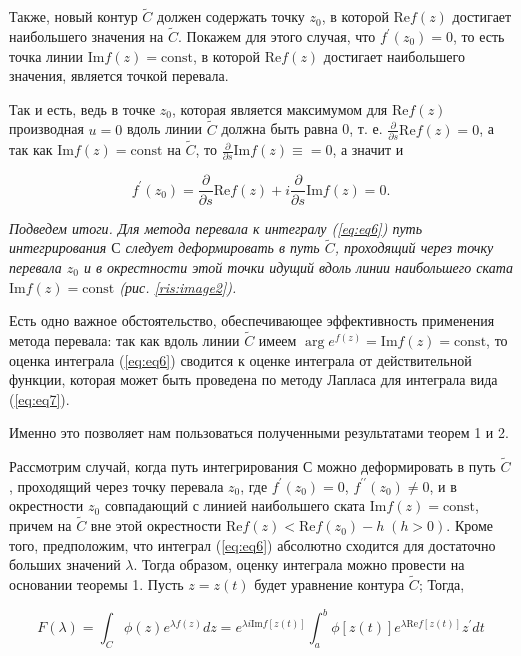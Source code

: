 \documentclass[14pt]{extarticle}
\renewcommand{\Re}{\mathrm{Re}}
\renewcommand{\Im}{\mathrm{Im}}
\newcommand{\const}{\mathrm{const}}
\begin{document}
Также, новый контур $\widetilde{C}$ должен содержать точку $z_0$, в которой $\Re f(z)$ достигает наибольшего значения на $\widetilde{C}$. Покажем для этого случая, что $f^\prime (z_0) = 0$, то есть точка линии $\Im f(z) = \const$, в которой $\Re f (z)$ достигает наибольшего значения, является точкой перевала.

Так и есть, ведь в точке $z_0$, которая является максимумом для $\Re f (z)$ производная $u=0$ вдоль линии $\widetilde{C}$ должна быть равна 0, т. е. $\frac{\partial}{\partial s}\Re f(z)=0$, а так как $\Im f(z) = \const$ на $\widetilde{C}$, то $\frac{\partial}{\partial s} \Im f(z) \equiv = 0$, а значит и 

$$
f^\prime(z_0) = \frac{\partial}{\partial s} \Re f(z) + i\frac{\partial}{\partial s} \Im f(z) = 0.
$$ 
  
\textit{Подведем итоги. Для метода перевала к интегралу (\ref{eq:eq6}) путь интегрирования $С$ следует деформировать в путь $\widetilde{C}$, проходящий через точку перевала $z_0$ и в окрестности этой точки идущий вдоль линии наибольшего ската $\Im f(z) = \const$ (рис. \ref{ris:image2}).}

Есть одно важное обстоятельство, обеспечивающее эффективность применения метода перевала: так как вдоль линии $\widetilde{C}$ имеем $\arg e^{f(z)} = \Im f(z) = \const$, то оценка интеграла (\ref{eq:eq6}) сводится к оценке интеграла от действительной функции, которая может быть проведена по методу Лапласа для интеграла вида (\ref{eq:eq7}).  

Именно это позволяет нам пользоваться полученными результатами теорем 1 и 2. 

Рассмотрим  случай, когда путь интегрирования $С$ можно деформировать в путь $\widetilde{C}$, проходящий через точку перевала $z_0$, где $f^\prime(z_0) = 0$, $f^{\prime\prime}(z_0)\neq0$, и в окрестности $z_0$ совпадающий с линией наибольшего ската $\Im f(z) = \const$, причем на $\widetilde{C}$ вне этой окрестности $\Re f(z) < \Re f(z_0) - h \;(h> 0)$. Кроме того, предположим, что интеграл (\ref{eq:eq6}) абсолютно сходится для достаточно больших значений $\lambda$.
Тогда образом, оценку интеграла можно провести на основании теоремы 1. Пусть $z = z(t)$ будет уравнение контура $\widetilde{C}$; Тогда,

\begin{equation}\label{eq:eq11}
F(\lambda) = \int_{C}^{}\phi(z) e^{\lambda f(z)}dz=e^{\lambda i \Im f[z(t)]}\int_{a}^{b}\phi[z(t)]e^{\lambda \Re f[z(t)]}z^{\prime} dt
\end{equation}
\end{document}
